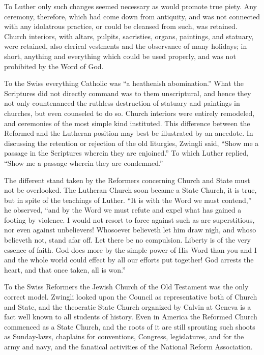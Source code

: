 \documentclass[
]{book}
\begin{document}
To Luther only such changes seemed necessary as would promote true piety. Any ceremony, therefore, which had come down from antiquity, and was not connected with any idolatrous practice, or could be cleansed from such, was retained. Church interiors, with altars, pulpits, sacristies, organs, paintings, and statuary, were retained, also clerical vestments and the observance of many holidays; in short, anything and everything which could be used properly, and was not prohibited by the Word of God.

To the Swiss everything Catholic was ``a heathenish abomination.'' What the Scriptures did not directly command was to them unscriptural, and hence they not only countenanced the ruthless destruction of statuary and paintings in churches, but even counseled to do so. Church interiors were entirely remodeled, and ceremonies of the most simple kind instituted. This difference between the Reformed and the Lutheran position may best be illustrated by an anecdote. In discussing the retention or rejection of the old liturgies, Zwingli said, ``Show me a passage in the Scriptures wherein they are enjoined.'' To which Luther replied, ``Show me a passage wherein they are condemned.''

The different stand taken by the Reformers concerning Church and State must not be overlooked. The Lutheran Church soon became a State Church, it is true, but in spite of the teachings of Luther. ``It is with the Word we must contend,'' he observed, ``and by the Word we must refute and expel what has gained a footing by violence. I would not resort to force against such as are superstitious, nor even against unbelievers! Whosoever believeth let him draw nigh, and whoso believeth not, stand afar off. Let there be no compulsion. Liberty is of the very essence of faith. God does more by the simple power of His Word than you and I and the whole world could effect by all our efforts put together! God arrests the heart, and that once taken, all is won.''

To the Swiss Reformers the Jewish Church of the Old Testament was the only correct model. Zwingli looked upon the Council as representative both of Church and State, and the theocratic State Church organized by Calvin at Geneva is a fact well known to all students of history. Even in America the Reformed Church commenced as a State Church, and the roots of it are still sprouting such shoots as Sunday-laws, chaplains for conventions, Congress, legislatures, and for the army and navy, and the fanatical activities of the National Reform Association.
\end{document}
